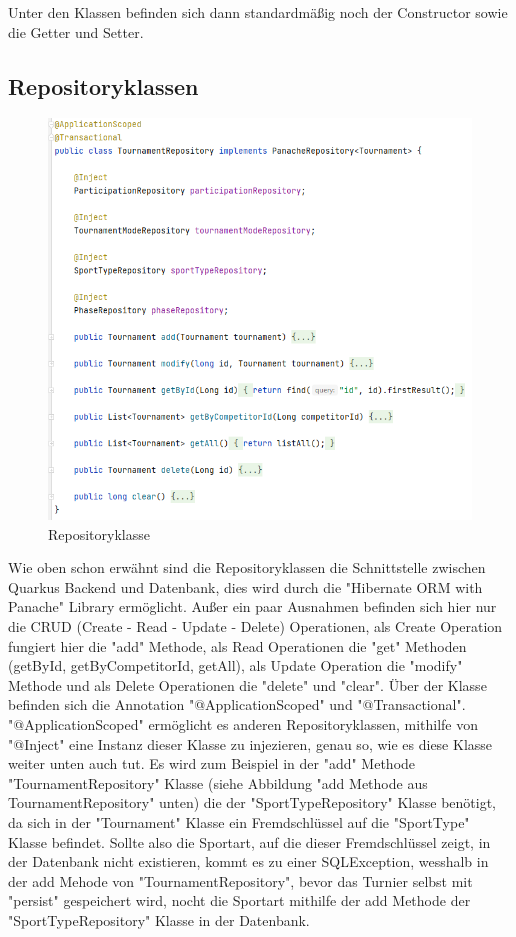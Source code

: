 Unter den Klassen befinden sich dann standardmäßig noch der Constructor sowie die Getter und Setter.

\subsection{Repositoryklassen}

\begin{figure}[H]
    \includegraphics[scale=0.8]{pics/repository_class.png}
    \caption{Repositoryklasse}
\end{figure}

Wie oben schon erwähnt sind die Repositoryklassen die Schnittstelle zwischen Quarkus Backend und Datenbank, dies wird durch die "Hibernate ORM with Panache" Library ermöglicht. 
Außer ein paar Ausnahmen befinden sich hier nur die CRUD (Create - Read - Update - Delete) Operationen, als Create Operation fungiert hier die "add" Methode, 
als Read Operationen die "get" Methoden (getById, getByCompetitorId, getAll), als Update Operation die "modify" Methode und als Delete Operationen die "delete" und "clear". 
Über der Klasse befinden sich die Annotation "@ApplicationScoped" und "@Transactional". "@ApplicationScoped" ermöglicht es anderen Repositoryklassen, mithilfe von "@Inject" eine Instanz dieser Klasse zu injezieren, genau so, 
wie es diese Klasse weiter unten auch tut. Es wird zum Beispiel in der "add" Methode "TournamentRepository" Klasse (siehe Abbildung "add Methode aus TournamentRepository" unten) die 
der "SportTypeRepository" Klasse benötigt, da sich in der "Tournament" Klasse ein Fremdschlüssel auf die "SportType" Klasse befindet. Sollte also die Sportart, 
auf die dieser Fremdschlüssel zeigt, in der Datenbank nicht existieren, kommt es zu einer SQLException, wesshalb in der add Mehode von "TournamentRepository", 
bevor das Turnier selbst mit "persist" gespeichert wird, nocht die Sportart mithilfe der add Methode der "SportTypeRepository" Klasse in der Datenbank. 

